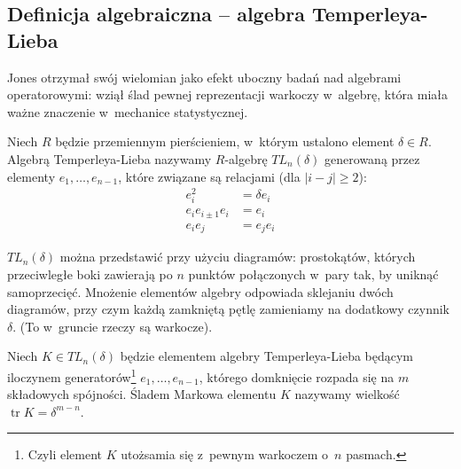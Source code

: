 \subsection{Definicja algebraiczna -- algebra Temperleya-Lieba} %
\label{sub:jones_paper}
Jones otrzymał swój wielomian jako efekt uboczny badań nad algebrami operatorowymi: wziął ślad pewnej reprezentacji warkoczy w~algebrę, która miała ważne znaczenie w~mechanice statystycznej.


\begin{definition}
    Niech $R$ będzie przemiennym pierścieniem, w~którym ustalono element $\delta \in R$.
    Algebrą Temperleya-Lieba nazywamy $R$-algebrę $TL_n(\delta)$ generowaną przez elementy $e_1, \ldots, e_{n-1}$, które związane są relacjami (dla $|i-j| \ge 2$):
    \begin{align*}
        e_i^2 & = \delta e_i \\
        e_i e_{i \pm 1} e_i & = e_i \\
        e_i e_j & = e_j e_i
    \end{align*}
\end{definition}

$TL_n(\delta)$ można przedstawić przy użyciu diagramów: prostokątów, których przeciwległe boki zawierają po $n$ punktów połączonych w~pary tak, by uniknąć samoprzecięć. Mnożenie elementów algebry odpowiada sklejaniu dwóch diagramów, przy czym każdą zamkniętą pętlę zamieniamy na dodatkowy czynnik $\delta$.
(To w~gruncie rzeczy są warkocze).

\begin{definition}
    Niech $K \in TL_n(\delta)$ będzie elementem algebry Temperleya-Lieba będącym iloczynem generatorów\footnote{Czyli element $K$ utożsamia się z~pewnym warkoczem o~$n$ pasmach.} $e_1, \ldots, e_{n-1}$, którego domknięcie rozpada się na $m$ składowych spójności.
    Śladem Markowa elementu $K$ nazywamy wielkość $\operatorname{tr} K = \delta^{m-n}$.
\end{definition}

